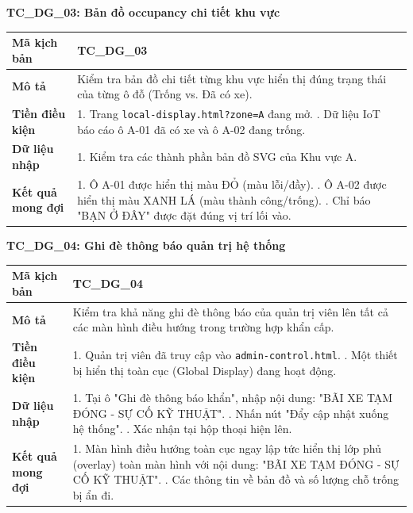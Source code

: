 \textbf{TC\_DG\_03: Bản đồ occupancy chi tiết khu vực}
\begin{table}[H]
    \centering
    \begin{tabularx}{\textwidth}{|l|X|}
        \hline
        \rowcolor[HTML]{EFEFEF} 
        \textbf{Mã kịch bản} & \textbf{TC\_DG\_03} \\ \hline
        \textbf{Mô tả} & Kiểm tra bản đồ chi tiết từng khu vực hiển thị đúng trạng thái của từng ô đỗ (Trống vs. Đã có xe). \\ \hline
        \textbf{Tiền điều kiện} & 1. Trang \texttt{local-display.html?zone=A} đang mở. \newline 2. Dữ liệu IoT báo cáo ô A-01 đã có xe và ô A-02 đang trống. \\ \hline
        \textbf{Dữ liệu nhập} & 1. Kiểm tra các thành phần bản đồ SVG của Khu vực A. \\ \hline
        \textbf{Kết quả mong đợi} & 1. Ô A-01 được hiển thị màu ĐỎ (màu lỗi/đầy). \newline 2. Ô A-02 được hiển thị màu XANH LÁ (màu thành công/trống). \newline 3. Chỉ báo "BẠN Ở ĐÂY" được đặt đúng vị trí lối vào. \\ \hline
    \end{tabularx}
\end{table}

\textbf{TC\_DG\_04: Ghi đè thông báo quản trị hệ thống}
\begin{table}[H]
    \centering
    \begin{tabularx}{\textwidth}{|l|X|}
        \hline
        \rowcolor[HTML]{EFEFEF} 
        \textbf{Mã kịch bản} & \textbf{TC\_DG\_04} \\ \hline
        \textbf{Mô tả} & Kiểm tra khả năng ghi đè thông báo của quản trị viên lên tất cả các màn hình điều hướng trong trường hợp khẩn cấp. \\ \hline
        \textbf{Tiền điều kiện} & 1. Quản trị viên đã truy cập vào \texttt{admin-control.html}. \newline 2. Một thiết bị hiển thị toàn cục (Global Display) đang hoạt động. \\ \hline
        \textbf{Dữ liệu nhập} & 1. Tại ô "Ghi đè thông báo khẩn", nhập nội dung: "BÃI XE TẠM ĐÓNG - SỰ CỐ KỸ THUẬT". \newline 2. Nhấn nút "Đẩy cập nhật xuống hệ thống". \newline 3. Xác nhận tại hộp thoại hiện lên. \\ \hline
        \textbf{Kết quả mong đợi} & 1. Màn hình điều hướng toàn cục ngay lập tức hiển thị lớp phủ (overlay) toàn màn hình với nội dung: "BÃI XE TẠM ĐÓNG - SỰ CỐ KỸ THUẬT". \newline 2. Các thông tin về bản đồ và số lượng chỗ trống bị ẩn đi. \\ \hline
    \end{tabularx}
\end{table}


